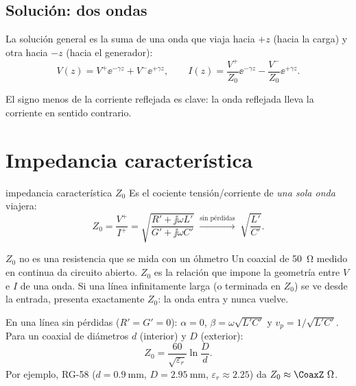 \subsection{Solución: dos ondas}
La solución general es la suma de una onda que viaja hacia $+z$ (hacia la carga) y otra hacia $-z$ (hacia el generador):
\begin{equation}
  V(z) = V^{+}\ee^{-\gamma z} + V^{-}\ee^{+\gamma z}, \qquad I(z) = \frac{V^{+}}{Z_0}\ee^{-\gamma z} - \frac{V^{-}}{Z_0}\ee^{+\gamma z}.
\end{equation}
\begin{donde}
\end{donde}
El signo menos de la corriente reflejada es clave: la onda reflejada lleva la corriente en sentido contrario.

\section{Impedancia característica}
\begin{definicion}{impedancia característica $Z_0$}
Es el cociente tensión/corriente de \emph{una sola onda} viajera:
\begin{equation}
  Z_0 = \frac{V^{+}}{I^{+}} = \sqrt{\frac{R' + \jj\omega L'}{G' + \jj\omega C'}} \;\xrightarrow{\text{sin pérdidas}}\; \sqrt{\frac{L'}{C'}} .
\end{equation}
\begin{donde}
\end{donde}
\end{definicion}
\begin{atencion}{$Z_0$ no es una resistencia que se mida con un óhmetro}
Un coaxial de \SI{50}{\ohm} medido en continua da circuito abierto. $Z_0$ es la relación que impone la geometría entre $V$ e $I$ de
una onda. Si una línea infinitamente larga (o terminada en $Z_0$) se ve desde la entrada, presenta exactamente $Z_0$: la onda
entra y nunca vuelve.
\end{atencion}

En una línea sin pérdidas ($R' = G' = 0$): $\alpha = 0$, $\beta = \omega\sqrt{L'C'}$ y $v_p = 1/\sqrt{L'C'}$.
Para un coaxial de diámetros $d$ (interior) y $D$ (exterior):
\begin{equation}
  Z_0 = \frac{60}{\sqrt{\varepsilon_r}}\ln\frac{D}{d} .
\end{equation}
Por ejemplo, RG-58 ($d=\SI{0.9}{\milli\metre}$, $D = \SI{2.95}{\milli\metre}$, $\varepsilon_r \approx 2.25$) da $Z_0 \approx \CoaxZ~\si{\ohm}$.

